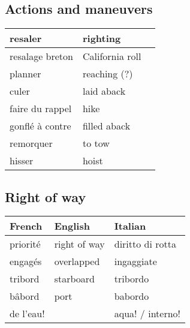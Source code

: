 \documentclass[a4paper, 12pt, twoside]{article}
\begin{document}
\begin{indt}{\section{Actions and maneuvers}}
\begin{tabular}{|l|l|l|}
            \hline %
            resaler %
            & righting
            &
            \\
            \hline %
            resalage breton %
            & California roll
            &
            \\
            \hline %
            planner %
            & reaching (?)
            &
            \\
            \hline %
            culer %
            & laid aback
            &
            \\
            \hline %
            faire du rappel %
            & hike
            &
            \\
            \hline %
            gonflé à contre %
            & filled aback
            &
            \\
            \hline %
            remorquer %
            & to tow
            &
            \\
            \hline %
            hisser %
            & hoist
            &
            \\
            \hline %
        \end{tabular}
    \end{indt} %

    \begin{indt}{\section{Right of way}} %
        \begin{tabular}{|l|l|l|}
            \hline %
            \textbf{French}
            & \textbf{English}
            & \textbf{Italian}
            \\
            \hline
            \hline %
            priorité %
            & right of way
            & diritto di rotta
            \\
            \hline %
            engagés %
            & overlapped
            & ingaggiate
            \\
            \hline %
            tribord %
            & starboard
            & tribordo
            \\
            \hline %
            bâbord %
            & port
            & babordo
            \\
            \hline %
            de l'eau! %
            &
            & aqua! / interno!
            \\
            \hline %
        \end{tabular}
    \end{indt} %
\end{document}
